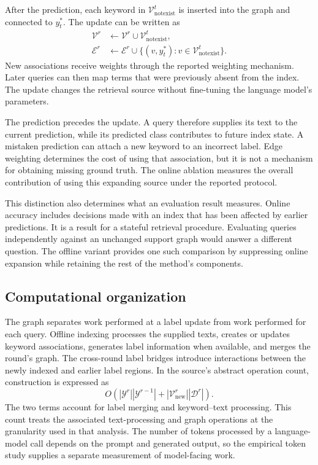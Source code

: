 After the prediction, each keyword in $\mathcal{V}_{\mathrm{notexist}}^t$ is inserted into the graph and connected to $y_t^*$. The update can be written as
\begin{align}
\mathcal{V}^r&\leftarrow\mathcal{V}^r\cup\mathcal{V}_{\mathrm{notexist}}^t,\\
\mathcal{E}^r&\leftarrow\mathcal{E}^r\cup\{(v,y_t^*):v\in\mathcal{V}_{\mathrm{notexist}}^t\}.
\label{eq:gorag:update}
\end{align}
New associations receive weights through the reported weighting mechanism. Later queries can then map terms that were previously absent from the index. The update changes the retrieval source without fine-tuning the language model's parameters.

The prediction precedes the update. A query therefore supplies its text to the current prediction, while its predicted class contributes to future index state. A mistaken prediction can attach a new keyword to an incorrect label. Edge weighting determines the cost of using that association, but it is not a mechanism for obtaining missing ground truth. The online ablation measures the overall contribution of using this expanding source under the reported protocol.

This distinction also determines what an evaluation result measures. Online accuracy includes decisions made with an index that has been affected by earlier predictions. It is a result for a stateful retrieval procedure. Evaluating queries independently against an unchanged support graph would answer a different question. The offline variant provides one such comparison by suppressing online expansion while retaining the rest of the method's components.


\subsection{Computational organization}
\label{sec:gorag:computation}

The graph separates work performed at a label update from work performed for each query. Offline indexing processes the supplied texts, creates or updates keyword associations, generates label information when available, and merges the round's graph. The cross-round label bridges introduce interactions between the newly indexed and earlier label regions. In the source's abstract operation count, construction is expressed as
\begin{equation}
O\!\left(|\mathcal{Y}^r||\mathcal{Y}^{r-1}|+|\mathcal{V}_{\mathrm{new}}^r||\mathcal{D}^r|\right).
\label{eq:gorag:constructioncost}
\end{equation}
The two terms account for label merging and keyword--text processing. This count treats the associated text-processing and graph operations at the granularity used in that analysis. The number of tokens processed by a language-model call depends on the prompt and generated output, so the empirical token study supplies a separate measurement of model-facing work.

